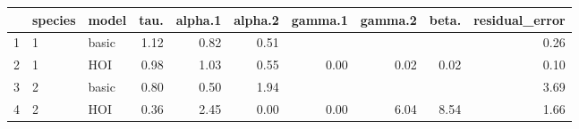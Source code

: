\begin{table}[ht]
\centering
\begin{tabular}{rllrrrrrrr}
  \hline
 & species & model & tau. & alpha.1 & alpha.2 & gamma.1 & gamma.2 & beta. & residual\_error \\ 
  \hline
1 & 1 & basic & 1.12 & 0.82 & 0.51 &  &  &  & 0.26 \\ 
  2 & 1 & HOI & 0.98 & 1.03 & 0.55 & 0.00 & 0.02 & 0.02 & 0.10 \\ 
  3 & 2 & basic & 0.80 & 0.50 & 1.94 &  &  &  & 3.69 \\ 
  4 & 2 & HOI & 0.36 & 2.45 & 0.00 & 0.00 & 6.04 & 8.54 & 1.66 \\ 
   \hline
\end{tabular}
\end{table}
